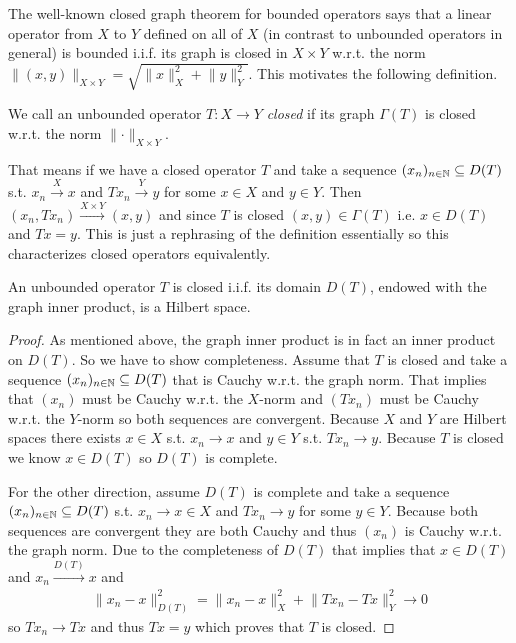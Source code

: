 \documentclass[../main.tex]{subfiles}
\begin{document}
The well-known closed graph theorem for bounded operators says that 
a linear operator from $X$ to $Y$ defined on all of $X$ 
(in contrast to unbounded operators in general) is bounded i.i.f. 
its graph is closed in $X\times Y$ w.r.t. the norm 
$\lVert (x,y) \rVert _{X\times Y} 
= \sqrt{\lVert x \rVert^2 _{X} + \lVert y \rVert^2 _{Y}}$. 
This motivates the following definition.

\begin{definition}
    We call an unbounded operator $T:X \rightarrow Y$ \textit{closed} if 
    its graph $\Gamma(T)$ is closed w.r.t. the norm 
    $\lVert \cdot \rVert _{X\times Y}$.
\end{definition}
That means if we have a closed operator $T$ and
take a sequence $(x_n)_{n\in \mathbb{N}} \subseteq D(T)$
s.t. $x_n \xrightarrow{X} x$ and $Tx_n \xrightarrow{Y} y$ for some 
$x \in X$ and $y \in Y$. Then $(x_n,Tx_n) \xrightarrow{X\times Y} (x,y)$ and 
since $T$ is closed
$(x,y) \in \Gamma(T)$ i.e. $x \in D(T)$ and $Tx = y$. This is just 
a rephrasing of the definition essentially so this characterizes closed
operators equivalently.

\begin{proposition}\label{prop:closed_operator_graph_norm}
    An unbounded operator $T$ is closed i.i.f. its domain $D(T)$, endowed with the 
    graph inner product, is a Hilbert space.
\end{proposition}
\begin{proof}
    As mentioned above, the graph inner product is in fact an inner product 
    on $D(T)$. So we have to show completeness.
    Assume that $T$ is closed and take a sequence $(x_n)_{n \in \mathbb{N}} 
    \subseteq D(T)$ that is Cauchy w.r.t. the graph norm. That implies 
    that $(x_n)$ must be Cauchy w.r.t. the $X$-norm and $(Tx_n)$ must be 
    Cauchy w.r.t. the $Y$-norm so both sequences are convergent. Because $X$ and $Y$ are Hilbert spaces 
    there exists $x \in X$ s.t. $x_n \rightarrow x$ and $y \in Y$ s.t. 
    $Tx_n \rightarrow y$. Because $T$ is closed we know 
    $x \in D(T)$ so $D(T)$ is complete.

    For the other direction, assume $D(T)$ is complete and take a sequence 
    $(x_n)_{n \in \mathbb{N}} \subseteq D(T)$ s.t. $x_n \rightarrow x \in X$ 
    and $Tx_n \rightarrow y$ for some $y \in Y$. Because both sequences are 
    convergent they are both Cauchy and thus $(x_n)$ is Cauchy w.r.t. the
    graph norm. Due to the completeness of $D(T)$ that implies that $x \in D(T)$
    and $x_n \xrightarrow{D(T)} x$ and 
    \begin{align*}
        \lVert x_n - x \rVert^2 _{D(T)} 
        = \lVert x_n - x \rVert^2 _X + \lVert Tx_n - Tx \rVert^2 _Y 
        \rightarrow 0
    \end{align*}
    so $T x_n \rightarrow T x$ and thus $Tx = y$ which proves that 
    $T$ is closed.
\end{proof}
\end{document}
